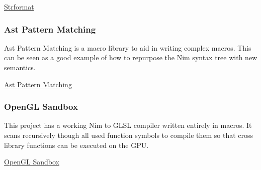 \href{https://github.com/nim-lang/Nim/blob/5845716df8c96157a047c2bd6bcdd795a7a2b9b1/lib/pure/strformat.nim\#L280}{Strformat}

\hypertarget{ast-pattern-matching}{%
\subsubsection{Ast Pattern Matching}\label{ast-pattern-matching}}

Ast Pattern Matching is a macro library to aid in writing complex
macros. This can be seen as a good example of how to repurpose the Nim
syntax tree with new semantics.

\href{https://github.com/krux02/ast-pattern-matching}{Ast Pattern
Matching}

\hypertarget{opengl-sandbox}{%
\subsubsection{OpenGL Sandbox}\label{opengl-sandbox}}

This project has a working Nim to GLSL compiler written entirely in
macros. It scans recursively though all used function symbols to compile
them so that cross library functions can be executed on the GPU.

\href{https://github.com/krux02/opengl-sandbox}{OpenGL Sandbox}
